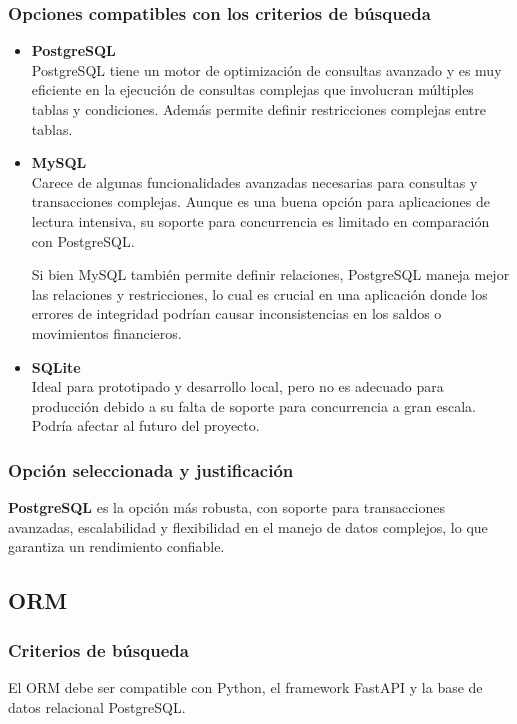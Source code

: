 \subsubsection{Opciones compatibles con los criterios de búsqueda}
\begin{itemize}
    \item \textbf{PostgreSQL}\\
        PostgreSQL tiene un motor de optimización de consultas avanzado y es muy eficiente en la ejecución de consultas complejas que involucran múltiples tablas y condiciones. Además permite definir restricciones complejas entre tablas.
    \item \textbf{MySQL}\\
        Carece de algunas funcionalidades avanzadas necesarias para consultas y transacciones complejas. Aunque es una buena opción para aplicaciones de lectura intensiva, su soporte para concurrencia es limitado en comparación con PostgreSQL.

        Si bien MySQL también permite definir relaciones, PostgreSQL maneja mejor las relaciones y restricciones, lo cual es crucial en una aplicación donde los errores de integridad podrían causar inconsistencias en los saldos o movimientos financieros.
        
    \item \textbf{SQLite}\\
        Ideal para prototipado y desarrollo local, pero no es adecuado para producción debido a su falta de soporte para concurrencia a gran escala. Podría afectar al futuro del proyecto.
\end{itemize}
\subsubsection{Opción seleccionada y justificación}
\textbf{PostgreSQL} es la opción más robusta, con soporte para transacciones avanzadas, escalabilidad y flexibilidad en el manejo de datos complejos, lo que garantiza un rendimiento confiable\cite{ordonez2017administracion}.

\subsection{ORM}
\subsubsection{Criterios de búsqueda}
El ORM debe ser compatible con Python, el framework FastAPI y la base de datos relacional PostgreSQL.


